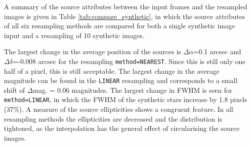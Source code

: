 A summary of the source attributes between the input frames and the resampled images is given in Table \ref{tab:compare_synthetic}, in which the source
attributes of all six resampling methods are compared for both a single synthetic image input and a resampling of 10 synthetic images.

The largest change in the average position of the sources is $\Delta\alpha$=0.1 arcsec and $\Delta\delta$=-0.008 arcsec for the resampling {\tt method=NEAREST}.
Since this is still only one half of a pixel, this is still acceptable.  The largest change in the average magnitude  can be found in the {\tt LINEAR} resampling and
corresponds to a small shift of $\Delta$mag. = 0.06 magnitudes.
The largest change in FWHM is seen for {\tt method=LINEAR}, in which the FWHM of the synthetic
stars increase by 1.8 pixels (37\%).    A measure of the source ellipticities shows a congruent feature.   In all resampling methods the ellipticities are decreased and the distribution is
tightened, as the interpolation has the general effect of circularising the source images.  



